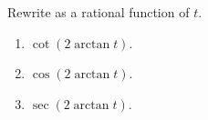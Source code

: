 Rewrite as a rational function of $t$.

\begin{enumerate}
\item $\cot (2\arctan t)$.
\item $\cos (2\arctan t)$.
\item $\sec (2\arctan t)$.
\end{enumerate}